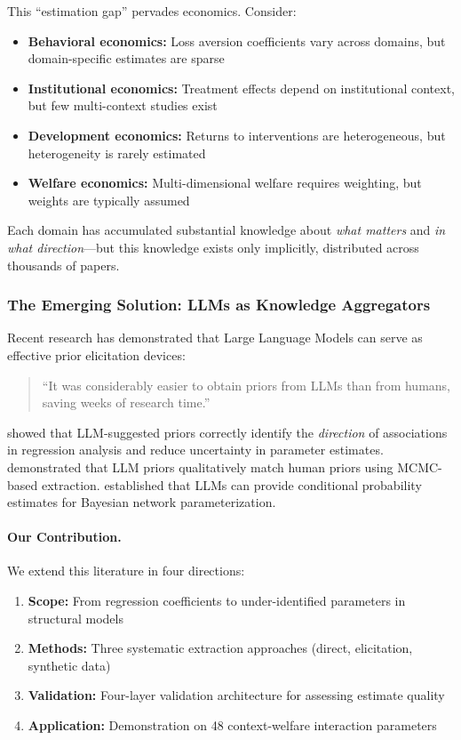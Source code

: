 This ``estimation gap'' pervades economics. Consider:
\begin{itemize}
    \item \textbf{Behavioral economics:} Loss aversion coefficients vary across domains, but domain-specific estimates are sparse
    \item \textbf{Institutional economics:} Treatment effects depend on institutional context, but few multi-context studies exist
    \item \textbf{Development economics:} Returns to interventions are heterogeneous, but heterogeneity is rarely estimated
    \item \textbf{Welfare economics:} Multi-dimensional welfare requires weighting, but weights are typically assumed
\end{itemize}

Each domain has accumulated substantial knowledge about \textit{what matters} and \textit{in what direction}---but this knowledge exists only implicitly, distributed across thousands of papers.

\subsubsection{The Emerging Solution: LLMs as Knowledge Aggregators}

Recent research has demonstrated that Large Language Models can serve as effective prior elicitation devices:

\begin{quote}
``It was considerably easier to obtain priors from LLMs than from humans, saving weeks of research time.'' \citep{glioblastoma2025}
\end{quote}

\citet{llmpriors2025scientific} showed that LLM-suggested priors correctly identify the \textit{direction} of associations in regression analysis and reduce uncertainty in parameter estimates. \citet{zhu2024eliciting} demonstrated that LLM priors qualitatively match human priors using MCMC-based extraction. \citet{nafar2025extracting} established that LLMs can provide conditional probability estimates for Bayesian network parameterization.

\paragraph{Our Contribution.}
We extend this literature in four directions:

\begin{enumerate}
    \item \textbf{Scope:} From regression coefficients to under-identified parameters in structural models
    \item \textbf{Methods:} Three systematic extraction approaches (direct, elicitation, synthetic data)
    \item \textbf{Validation:} Four-layer validation architecture for assessing estimate quality
    \item \textbf{Application:} Demonstration on 48 context-welfare interaction parameters
\end{enumerate}

